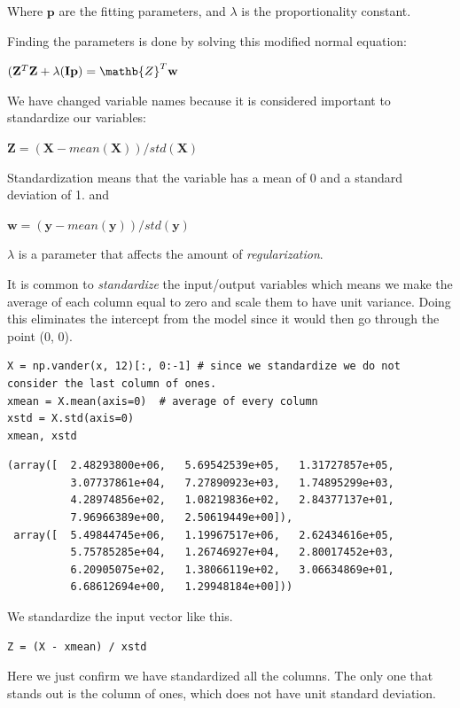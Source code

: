 \documentclass[11pt]{article}
\begin{document}
Where \(\mathbf{p}\) are the fitting parameters, and \(\lambda\) is the proportionality constant.

Finding the parameters is done by solving this modified normal equation:

\((\mathbf{Z}^T \mathbf{Z} + \lambda(\mathbf{I} \mathbf{p}) = \mathb{Z}^T \mathbf{w}\)

We have changed variable names because it is considered important to standardize our variables:

\(\mathbf{Z} = (\mathbf{X} - mean(\mathbf{X})) / std(\mathbf{X})\)

Standardization means that the variable has a mean of 0 and a standard deviation of 1.
and

\(\mathbf{w} = (\mathbf{y} - mean(\mathbf{y})) / std(\mathbf{y})\)

\(\lambda\) is a parameter that affects the amount of \emph{regularization}.

It is common to \emph{standardize} the input/output variables which means we make the average of each column equal to zero and scale them to have unit variance. Doing this eliminates the intercept from the model since it would then go through the point (0, 0).

\begin{verbatim}
X = np.vander(x, 12)[:, 0:-1] # since we standardize we do not consider the last column of ones.
xmean = X.mean(axis=0)  # average of every column
xstd = X.std(axis=0)
xmean, xstd
\end{verbatim}

\begin{verbatim}
(array([  2.48293800e+06,   5.69542539e+05,   1.31727857e+05,
          3.07737861e+04,   7.27890923e+03,   1.74895299e+03,
          4.28974856e+02,   1.08219836e+02,   2.84377137e+01,
          7.96966389e+00,   2.50619449e+00]),
 array([  5.49844745e+06,   1.19967517e+06,   2.62434616e+05,
          5.75785285e+04,   1.26746927e+04,   2.80017452e+03,
          6.20905075e+02,   1.38066119e+02,   3.06634869e+01,
          6.68612694e+00,   1.29948184e+00]))
\end{verbatim}

We standardize the input vector like this.

\begin{verbatim}
Z = (X - xmean) / xstd
\end{verbatim}

Here we just confirm we have standardized all the columns. The only one that stands out is the column of ones, which does not have unit standard deviation.
\end{document}
